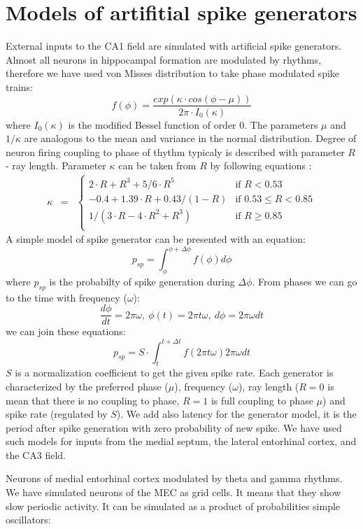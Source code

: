 \documentclass[a4paper,12pt]{article}
\begin{document}
\section{Models of artifitial spike generators}
External inputs to the CA1 field are simulated with artificial spike generators. Almost all neurons in hippocampal formation are modulated by rhythms, therefore we have used von Misses distribution to take phase modulated spike trains:
\begin{equation}
f(\phi) = \frac{exp(\kappa \cdot cos(\phi - \mu) )  }{2\pi \cdot I_0(\kappa) }
\end{equation}
where $I_0(\kappa)$ is the modified Bessel function of order 0. The parameters $\mu$ and $1/\kappa$  are analogous to the mean and variance in the normal distribution. Degree of neuron firing coupling to phase of thythm typicaly is described with parameter $R$ - ray length. Parameter $\kappa$ can be taken from $R$ by following equations \cite{mardia_directional_1999}: 
\begin{equation}
\begin{matrix}
\kappa & = & \left\{
	\begin{matrix}
	2 \cdot R + R^3 + 5/6 \cdot R^5 & \mbox{if } R < 0.53 \\
	-0.4 + 1.39 \cdot R + 0.43 / (1 - R) & \mbox{if } 0.53 \leq   R < 0.85  \\
	1 / (3\cdot R - 4\cdot R^2 + R^3) & \mbox{if } R \geq 0.85 \\
	\end{matrix} \right.
\end{matrix}
\end{equation}
A simple model of spike generator can be presented with an equation:
\begin{equation}
\label{eq:spike_prob_phases}
p_{sp} = \int_\phi^{\phi + \Delta \phi} f(\phi) d \phi
\end{equation}
where $p_{sp}$ is the probabilty of spike generation during $\Delta \phi$. From phases we can go to the time with frequency ($\omega$):
\begin{equation}
\frac{d \phi}{dt} = 2 \pi \omega, \ \phi(t)=2\pi t \omega, \ d\phi=2 \pi \omega dt
\end{equation}
we can join these equations:
\begin{equation}
p_{sp} = S \cdot \int_t^{t + \Delta t} f(2\pi t \omega) 2 \pi \omega dt
\end{equation}
$S$ is a normalization coefficient to get the given spike rate. Each generator is
characterized by the preferred phase ($\mu$), frequency ($\omega$), ray length ($R=0$
is mean that there is no coupling to phase, $R = 1$ is full coupling to phase $\mu$)
and spike rate (regulated by $S$). We add also latency for the generator model, it
is the period after spike generation with zero probability of new spike. We have
used such models for inputs from the medial septum, the lateral entorhinal cortex, and the CA3 field. \par
Neurons of medial entorhinal cortex modulated by theta and gamma
rhythms. We have simulated neurons of the MEC as grid cells. It means
that they show slow periodic activity. It can be simulated as a product of
probabilities simple oscillators:
\end{document}
